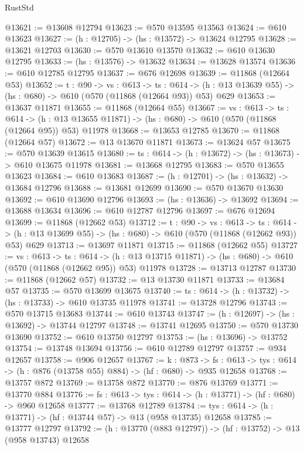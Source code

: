 \begin{lexlean}{RustStd}
\begin{coremodule}
@13621 := @13608 @12794
@13623 := @570 @13595 @13563
@13624 := @610 @13623
@13627 := (h : @12705) -> (hs : @13572) -> @13624 @12795
@13628 := @13621 @12703
@13630 := @570 @13610 @13570
@13632 := @610 @13630 @12795
@13633 := (hs : @13576) -> @13632
@13634 := @13628 @13574
@13636 := @610 @12785 @12795
@13637 := @676 @12698
@13639 := @11868 (@12664 @53)
@13652 := {t : @90} ->
  {vs : @613} ->
  {ts : @614} -> (h : @13 @13639 @55) -> (hs : @680) -> @610 (@570 (@11868 (@12664 @93)) @53) @629
@13653 := @13637 @11871
@13655 := @11868 (@12664 @55)
@13667 := {vs : @613} ->
  {ts : @614} ->
  (h : @13 @13655 @11871) -> (hs : @680) -> @610 (@570 (@11868 (@12664 @95)) @53) @11978
@13668 := @13653 @12785
@13670 := @11868 (@12664 @57)
@13672 := @13 @13670 @11871
@13673 := @13624 @57
@13675 := @570 @13639 @13615
@13680 := {ts : @614} -> (h : @13672) -> (hs : @13673) -> @610 @13675 @11978
@13681 := @13668 @12795
@13683 := @570 @13655 @13623
@13684 := @610 @13683
@13687 := (h : @12701) -> (hs : @13632) -> @13684 @12796
@13688 := @13681 @12699
@13690 := @570 @13670 @13630
@13692 := @610 @13690 @12796
@13693 := (hs : @13636) -> @13692
@13694 := @13688 @13634
@13696 := @610 @12787 @12796
@13697 := @676 @12694
@13699 := @11868 (@12662 @53)
@13712 := {t : @90} ->
  {vs : @613} ->
  {ts : @614} -> (h : @13 @13699 @55) -> (hs : @680) -> @610 (@570 (@11868 (@12662 @93)) @53) @629
@13713 := @13697 @11871
@13715 := @11868 (@12662 @55)
@13727 := {vs : @613} ->
  {ts : @614} ->
  (h : @13 @13715 @11871) -> (hs : @680) -> @610 (@570 (@11868 (@12662 @95)) @53) @11978
@13728 := @13713 @12787
@13730 := @11868 (@12662 @57)
@13732 := @13 @13730 @11871
@13733 := @13684 @57
@13735 := @570 @13699 @13675
@13740 := {ts : @614} -> (h : @13732) -> (hs : @13733) -> @610 @13735 @11978
@13741 := @13728 @12796
@13743 := @570 @13715 @13683
@13744 := @610 @13743
@13747 := (h : @12697) -> (hs : @13692) -> @13744 @12797
@13748 := @13741 @12695
@13750 := @570 @13730 @13690
@13752 := @610 @13750 @12797
@13753 := (hs : @13696) -> @13752
@13754 := @13748 @13694
@13756 := @610 @12789 @12797
@13757 := @934 @12657
@13758 := @906 @12657
@13767 := {k : @873} ->
  {fs : @613} -> {tys : @614} -> (h : @876 (@13758 @55) @884) -> (hf : @680) -> @935 @12658
@13768 := @13757 @872
@13769 := @13758 @872
@13770 := @876 @13769
@13771 := @13770 @884
@13776 := {fs : @613} -> {tys : @614} -> (h : @13771) -> (hf : @680) -> @960 @12658
@13777 := @13768 @12789
@13784 := {tys : @614} -> (h : @13771) -> (hf : @13744 @57) -> @13 (@958 @13735) @12658
@13785 := @13777 @12797
@13792 := (h : @13770 (@883 @12797)) -> (hf : @13752) -> @13 (@958 @13743) @12658

\end{coremodule}
\end{lexlean}

